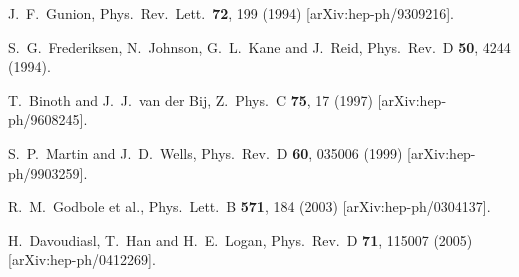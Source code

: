 \documentclass[12pt]{article}
\begin{document}
\begin{thebibliography}{9}
  J.~F.~Gunion,
  Phys.\ Rev.\ Lett.\  {\bf 72}, 199 (1994)
  [arXiv:hep-ph/9309216].

  S.~G.~Frederiksen, N.~Johnson, G.~L.~Kane and J.~Reid,
  Phys.\ Rev.\  D {\bf 50}, 4244 (1994).

  T.~Binoth and J.~J.~van der Bij,
  Z.\ Phys.\  C {\bf 75}, 17 (1997)
  [arXiv:hep-ph/9608245].

  S.~P.~Martin and J.~D.~Wells,
  Phys.\ Rev.\  D {\bf 60}, 035006 (1999)
  [arXiv:hep-ph/9903259].

  R.~M.~Godbole et al.,
  Phys.\ Lett.\  B {\bf 571}, 184 (2003)
  [arXiv:hep-ph/0304137].

  H.~Davoudiasl, T.~Han and H.~E.~Logan,
  Phys.\ Rev.\  D {\bf 71}, 115007 (2005)
  [arXiv:hep-ph/0412269].



\end{thebibliography}
\end{document}
